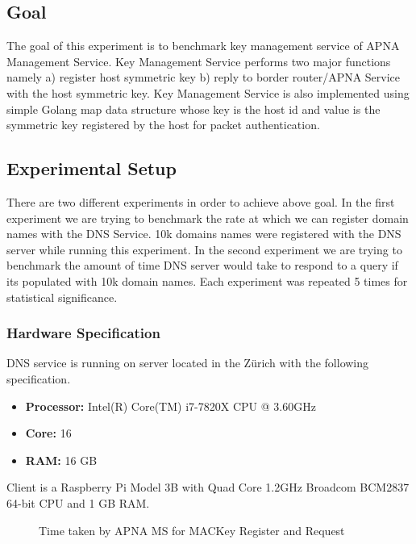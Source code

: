 \subsection{Goal}
The goal of this experiment is to benchmark key management service of APNA Management Service. Key Management Service performs two major functions namely a) register host symmetric key b) reply to border router/APNA Service with the host symmetric key. Key Management Service is also implemented using simple Golang map data structure whose key is the host id and value is the symmetric key registered by the host for packet authentication.

\subsection{Experimental Setup}
There are two different experiments in order to achieve above goal. In the first experiment we are trying to benchmark the rate at which we can register domain names with the DNS Service. 10k domains names were registered with the DNS server while running this experiment. In the second experiment we are trying to benchmark the amount of time DNS server would take to respond to a query if its populated with 10k domain names. Each experiment was repeated 5 times for statistical significance.
\subsubsection{Hardware Specification}
DNS service is running on server located in the Z\"urich with the following specification.
\begin{itemize}
    \item \textbf{Processor:} Intel(R) Core(TM) i7-7820X CPU @ 3.60GHz
    \item \textbf{Core:} 16
    \item \textbf{RAM:} 16 GB
\end{itemize}
Client is a Raspberry Pi Model 3B with Quad Core 1.2GHz Broadcom BCM2837 64-bit CPU and 1 GB RAM.

\begin{figure}[th!!]
\centering
\noindent
{}
\decoRule
\caption[MACKey Operations]{Time taken by APNA MS for MACKey Register and Request}
\label{fig:perf_ephid}
\end{figure}

